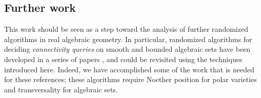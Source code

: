 \documentclass[12pt]{article}
\begin{document}
\subsection{Further work}
This work should be seen as a step toward the analysis of
further randomized algorithms in real algebraic geometry.  In particular, randomized algorithms for deciding {\em
  connectivity queries} on smooth and bounded algebraic sets have been
developed in a series of papers
\cite{SchostMohabBabySteps2011,SchostMohabBabySteps2014}, and could be
revisited using the techniques introduced here. Indeed, we have accomplished some of the work that is needed for these references; these algorithms require Noether position for polar varieties and transversality for algebraic sets. 





\end{document}
